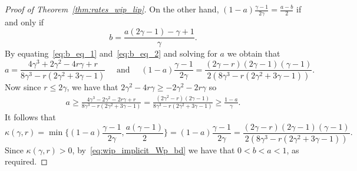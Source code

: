 \documentclass[10pt,a4paper]{amsart}
\begin{document}
\begin{proof}[Proof of Theorem~\ref{thm:rates_wip_lip}]
	On the other hand, $(1-a)\frac{\gamma-1}{2\gamma}=\frac{a-b}{2}$ if and only if 
	\begin{equation}\label{eq:b_eq_2}
		b = \frac{a(2\gamma-1)-\gamma+1}{\gamma}.
	\end{equation}
	By equating~\eqref{eq:b_eq_1} and~\eqref{eq:b_eq_2} and solving for $a$ we obtain that 
	\[ a=\frac{4\gamma^3+2\gamma^2 - 4r\gamma + r}{8\gamma^3 - r(2\gamma^2 + 3\gamma - 1)}\quad \text{ and }\quad (1-a)\frac{\gamma-1}{2\gamma}=\frac{(2\gamma-r)(2\gamma-1)(\gamma-1)}{2(8\gamma^3 - r(2\gamma^2 + 3\gamma - 1))}{.}
	\]
	Now since $r\le 2\gamma$, we have that $2\gamma^2-4r\gamma\ge -2\gamma^2-2r\gamma$ so
	\begin{align*}
		a \ge \frac{4\gamma^3-2\gamma^2 - 2r\gamma + r}{8\gamma^3 - r(2\gamma^2 + 3\gamma - 1)}=\frac{(2\gamma^2-r)(2\gamma-1)}{8\gamma^3 - r(2\gamma^2 + 3\gamma - 1)}
		\ge \frac{1-a}{\gamma}.
	\end{align*}
	It follows that
	\[ \kappa(\gamma,r)=\min\Big\{(1-a)\frac{\gamma-1}{2\gamma},\frac{a(\gamma-1)}{2} \Big\}=(1-a)\frac{\gamma-1}{2\gamma}=\frac{(2\gamma-r)(2\gamma-1)(\gamma-1)}{2(8\gamma^3 - r(2\gamma^2 + 3\gamma - 1))}.\]
	Since $\kappa(\gamma,r)>0$, by~\eqref{eq:wip_implicit_Wp_bd} we have that $0<b<a<1$, as required.
\end{proof}
\end{document}
